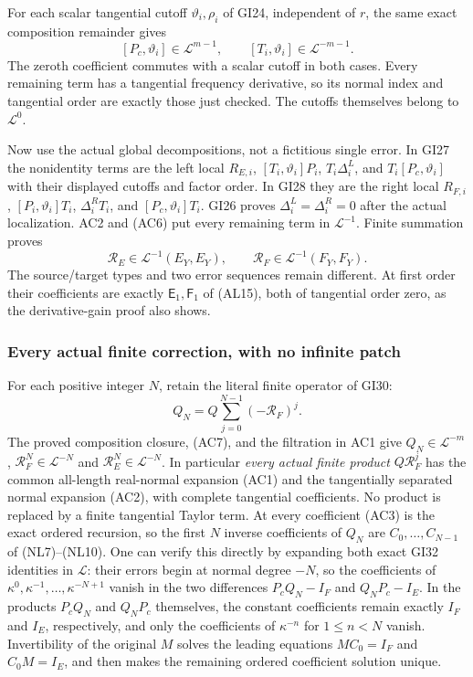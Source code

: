 \documentclass[
  11pt,
]{article}
\begin{document}
For each scalar tangential cutoff \(\vartheta_i,\rho_i\) of GI24,
independent of \(r\), the same exact composition remainder gives \[
 [P_c,\vartheta_i]\in\mathcal L^{m-1},\qquad
 [T_i,\vartheta_i]\in\mathcal L^{-m-1}.
 \tag{AC6}
\] The zeroth coefficient commutes with a scalar cutoff in both cases.
Every remaining term has a tangential frequency derivative, so its
normal index and tangential order are exactly those just checked. The
cutoffs themselves belong to \(\mathcal L^0\).

Now use the actual global decompositions, not a fictitious single error.
In GI27 the nonidentity terms are the left local \(R_{E,i}\),
\([T_i,\vartheta_i]P_i\), \(T_i\Delta_i^L\), and
\(T_i[P_c,\vartheta_i]\) with their displayed cutoffs and factor order.
In GI28 they are the right local \(R_{F,i}\), \([P_i,\vartheta_i]T_i\),
\(\Delta_i^RT_i\), and \([P_c,\vartheta_i]T_i\). GI26 proves
\(\Delta_i^L=\Delta_i^R=0\) after the actual localization. AC2 and (AC6)
put every remaining term in \(\mathcal L^{-1}\). Finite summation proves
\[
 \mathcal R_E\in\mathcal L^{-1}(E_Y,E_Y),\qquad
 \mathcal R_F\in\mathcal L^{-1}(F_Y,F_Y).
 \tag{AC7}
\] The source/target types and two error sequences remain different. At
first order their coefficients are exactly \(\mathsf E_1,\mathsf F_1\)
of (AL15), both of tangential order zero, as the derivative-gain proof
also shows.

\subsubsection{Every actual finite correction, with no infinite
patch}\label{every-actual-finite-correction-with-no-infinite-patch}

For each positive integer \(N\), retain the literal finite operator of
GI30: \[
 Q_N=Q\sum_{j=0}^{N-1}(-\mathcal R_F)^j .
 \tag{AC8}
\] The proved composition closure, (AC7), and the filtration in AC1 give
\(Q_N\in\mathcal L^{-m}\), \(\mathcal R_F^N\in\mathcal L^{-N}\) and
\(\mathcal R_E^N\in\mathcal L^{-N}\). In particular \emph{every actual
finite product} \(Q\mathcal R_F^j\) has the common all-length
real-normal expansion (AC1) and the tangentially separated normal
expansion (AC2), with complete tangential coefficients. No product is
replaced by a finite tangential Taylor term. At every coefficient (AC3)
is the exact ordered recursion, so the first \(N\) inverse coefficients
of \(Q_N\) are \(C_0,\ldots,C_{N-1}\) of (NL7)--(NL10). One can verify
this directly by expanding both exact GI32 identities in \(\mathcal L\):
their errors begin at normal degree \(-N\), so the coefficients of
\(\kappa^0,\kappa^{-1},\ldots,\kappa^{-N+1}\) vanish in the two
differences \(P_cQ_N-I_F\) and \(Q_NP_c-I_E\). In the products
\(P_cQ_N\) and \(Q_NP_c\) themselves, the constant coefficients remain
exactly \(I_F\) and \(I_E\), respectively, and only the coefficients of
\(\kappa^{-n}\) for \(1\le n<N\) vanish. Invertibility of the original
\(M\) solves the leading equations \(MC_0=I_F\) and \(C_0M=I_E\), and
then makes the remaining ordered coefficient solution unique.
\end{document}
